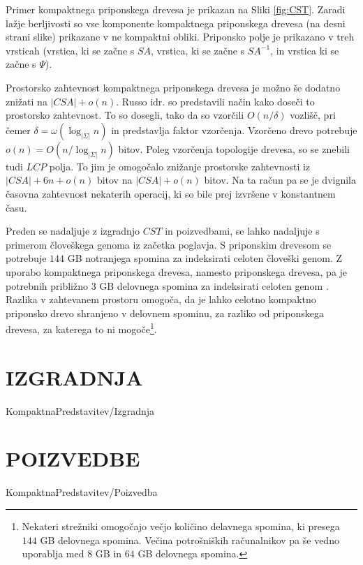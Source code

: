 Primer kompaktnega priponskega drevesa je prikazan na Sliki \ref{fig:CST}. Zaradi lažje berljivosti so vse komponente kompaktnega priponskega drevesa (na desni strani slike) prikazane v ne kompaktni obliki. Priponsko polje je prikazano v treh vrsticah (vrstica, ki se začne s $SA$, vrstica, ki se začne s $SA^{-1}$, in vrstica ki se začne s $\Psi$).

Prostorsko zahtevnost kompaktnega priponskega drevesa je možno še dodatno znižati na $|CSA|+o(n)$. Russo idr. \cite{Russo2008} so predstavili način kako doseči to prostorsko zahtevnost. To so dosegli, tako da so vzorčili $O(n/\delta)$ vozlišč, pri čemer $\delta=\omega(\log_{|\Sigma|}{n})$ in predstavlja faktor vzorčenja. Vzorčeno drevo potrebuje $o(n)=O(n/\log_{|\Sigma|}{n})$ bitov. Poleg vzorčenja topologije drevesa, so se znebili tudi $LCP$ polja. To jim je omogočalo znižanje prostorske zahtevnosti iz $|CSA|+6n+o(n)$ bitov na $|CSA|+o(n)$ bitov. Na ta račun pa se je dvignila časovna zahtevnost nekaterih operacij, ki so bile prej izvršene v konstantnem času.

Preden se nadaljuje z izgradnjo $CST$ in poizvedbami, se lahko nadaljuje s primerom človeškega genoma iz začetka poglavja. S priponskim drevesom se potrebuje $144$ GB notranjega spomina za indeksirati celoten človeški genom. Z  uporabo kompaktnega priponskega drevesa, namesto priponskega drevesa, pa je potrebnih približno $3$ GB delovnega spomina za indeksirati celoten genom \cite{Russo2008}. Razlika v zahtevanem prostoru omogoča, da je lahko celotno kompaktno priponsko drevo shranjeno v delovnem spominu, za razliko od priponskega drevesa, za katerega to ni mogoče\footnote{Nekateri strežniki omogočajo večjo količino delavnega spomina, ki presega $144$ GB delovnega spomina. Večina potrošniških računalnikov pa še vedno uporablja med $8$ GB in $64$ GB delovnega spomina.}.

\section{IZGRADNJA}\label{sec:CSTizgradnja}
{KompaktnaPredstavitev/Izgradnja}

\section{POIZVEDBE}\label{sec:CSTpoizvedba}
{KompaktnaPredstavitev/Poizvedba}



